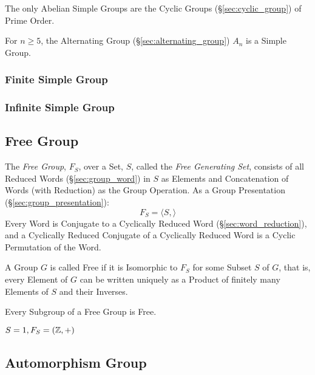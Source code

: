 The only Abelian Simple Groups are the Cyclic Groups
(\S\ref{sec:cyclic_group}) of Prime Order.

For $n \geq 5$, the Alternating Group (\S\ref{sec:alternating_group})
$A_n$ is a Simple Group.



\subsubsection{Finite Simple Group}\label{sec:finite_simple_group}

\subsubsection{Infinite Simple Group}\label{sec:infinite_simple_group}



\subsection{Free Group}\label{sec:free_group}

The \emph{Free Group}, $F_S$, over a Set, $S$, called the \emph{Free
  Generating Set}, consists of all Reduced Words
(\S\ref{sec:group_word}) in $S$ as Elements and Concatenation of Words
(with Reduction) as the Group Operation. As a Group Presentation
(\S\ref{sec:group_presentation}):
\[
    F_S = \langle S, \rangle
\]
Every Word is Conjugate to a Cyclically Reduced Word
(\S\ref{sec:word_reduction}), and a Cyclically Reduced Conjugate of a
Cyclically Reduced Word is a Cyclic Permutation of the Word.

A Group $G$ is called Free if it is Isomorphic to $F_S$ for some
Subset $S$ of $G$, that is, every Element of $G$ can be written
uniquely as a Product of finitely many Elements of $S$ and their
Inverses.

Every Subgroup of a Free Group is Free. \cite{hatcher02}

$S = {1}, F_S = (\mathbb{Z},+)$



\subsection{Automorphism Group}\label{sec:automorphism_group}

